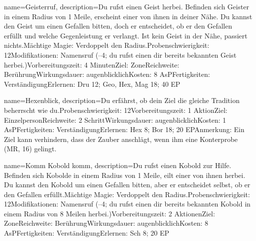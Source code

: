 {
    name={Geisterruf},
    description={Du rufst einen Geist herbei. Befinden sich Geister in einem Radius von 1 Meile, erscheint einer von ihnen in deiner Nähe. Du kannst den Geist um einen Gefallen bitten, doch er entscheidet, ob er den Gefallen erfüllt und welche Gegenleistung er verlangt. Ist kein Geist in der Nähe, passiert nichts.\newline Mächtige Magie: Verdoppelt den Radius.\newline Probenschwierigkeit: 12\newline Modifikationen: Namensruf (–4; du rufst einen dir bereits bekannten Geist herbei.)\newline Vorbereitungszeit: 4 Minuten\newline Ziel: Zone\newline Reichweite: Berührung\newline Wirkungsdauer: augenblicklich\newline Kosten: 8 AsP\newline Fertigkeiten: Verständigung\newline Erlernen: Dru 12; Geo, Hex, Mag 18; 40 EP}
}


{
    name={Hexenblick},
    description={Du erfährst, ob dein Ziel die gleiche Tradition beherrscht wie du.\newline Probenschwierigkeit: 12\newline Vorbereitungszeit: 1 Aktion\newline Ziel: Einzelperson\newline Reichweite: 2 Schritt\newline Wirkungsdauer: augenblicklich\newline Kosten: 1 AsP\newline Fertigkeiten: Verständigung\newline Erlernen: Hex 8; Bor 18; 20 EP\newline Anmerkung: Ein Ziel kann verhindern, dass der Zauber anschlägt, wenn ihm eine Konterprobe (MR, 16) gelingt.}
}


{
    name={Komm Kobold komm},
    description={Du rufst einen Kobold zur Hilfe. Befinden sich Kobolde in einem Radius von 1 Meile, eilt einer von ihnen herbei. Du kannst den Kobold um einen Gefallen bitten, aber er entscheidet selbst, ob er den Gefallen erfüllt.\newline Mächtige Magie: Verdoppelt den Radius.\newline Probenschwierigkeit: 12\newline Modifikationen: Namensruf (–4; du rufst einen dir bereits bekannten Kobold in einem Radius von 8 Meilen herbei.)\newline Vorbereitungszeit: 2 Aktionen\newline Ziel: Zone\newline Reichweite: Berührung\newline Wirkungsdauer: augenblicklich\newline Kosten: 8 AsP\newline Fertigkeiten: Verständigung\newline Erlernen: Sch 8; 20 EP}
}


